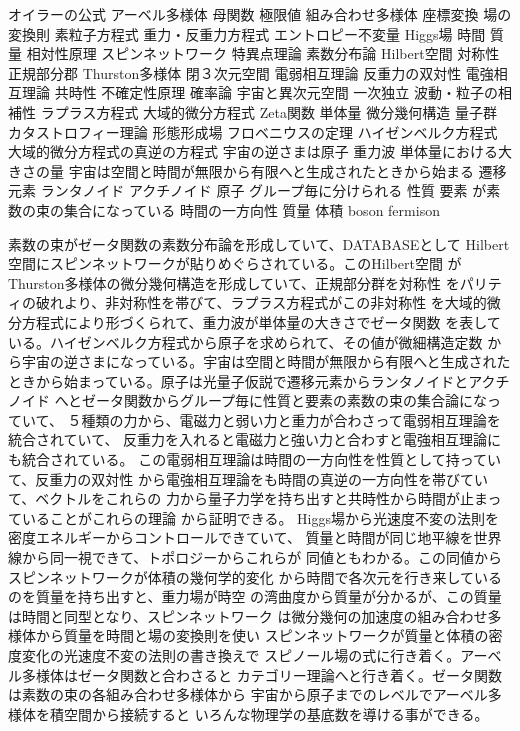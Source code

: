 \documentclass{jsarticle}
\begin{document}
\title{}
\author{}
\date{}
\maketitle

  オイラーの公式 アーベル多様体 母関数 極限値 組み合わせ多様体 
  座標変換 場の変換則 素粒子方程式 重力・反重力方程式
  エントロピー不変量 Higgs場 時間 質量 相対性原理 スピンネットワーク
  特異点理論 素数分布論 Hilbert空間 対称性 正規部分郡
  Thurston多様体 閉３次元空間 電弱相互理論 反重力の双対性
  電強相互理論 共時性 不確定性原理 確率論 宇宙と異次元空間
  一次独立 波動・粒子の相補性 ラプラス方程式 大域的微分方程式
  Zeta関数 単体量 微分幾何構造 量子群 カタストロフィー理論
  形態形成場 フロベニウスの定理 
  ハイゼンベルク方程式 大域的微分方程式の真逆の方程式
  宇宙の逆さまは原子 重力波 単体量における大きさの量 
  宇宙は空間と時間が無限から有限へと生成されたときから始まる
  遷移元素 ランタノイド アクチノイド
  原子 グループ毎に分けられる 
  性質 要素 が素数の束の集合になっている 
  時間の一方向性 
  質量 体積
  boson fermison

  素数の束がゼータ関数の素数分布論を形成していて、DATABASEとして
  Hilbert空間にスピンネットワークが貼りめぐらされている。このHilbert空間
  がThurston多様体の微分幾何構造を形成していて、正規部分群を対称性
  をパリティの破れより、非対称性を帯びて、ラプラス方程式がこの非対称性
  を大域的微分方程式により形づくられて、重力波が単体量の大きさでゼータ関数
  を表している。ハイゼンベルク方程式から原子を求められて、その値が微細構造定数
  から宇宙の逆さまになっている。宇宙は空間と時間が無限から有限へと生成された
  ときから始まっている。原子は光量子仮説で遷移元素からランタノイドとアクチノイド
  へとゼータ関数からグループ毎に性質と要素の素数の束の集合論になっていて、
  ５種類の力から、電磁力と弱い力と重力が合わさって電弱相互理論を統合されていて、
  反重力を入れると電磁力と強い力と合わすと電強相互理論にも統合されている。
  この電弱相互理論は時間の一方向性を性質として持っていて、反重力の双対性
  から電強相互理論をも時間の真逆の一方向性を帯びていて、ベクトルをこれらの
  力から量子力学を持ち出すと共時性から時間が止まっていることがこれらの理論
  から証明できる。
  Higgs場から光速度不変の法則を密度エネルギーからコントロールできていて、
  質量と時間が同じ地平線を世界線から同一視できて、トポロジーからこれらが
  同値ともわかる。この同値からスピンネットワークが体積の幾何学的変化
  から時間で各次元を行き来しているのを質量を持ち出すと、重力場が時空
  の湾曲度から質量が分かるが、この質量は時間と同型となり、スピンネットワーク
  は微分幾何の加速度の組み合わせ多様体から質量を時間と場の変換則を使い
  スピンネットワークが質量と体積の密度変化の光速度不変の法則の書き換えで
  スピノール場の式に行き着く。アーベル多様体はゼータ関数と合わさると
  カテゴリー理論へと行き着く。ゼータ関数は素数の束の各組み合わせ多様体から
  宇宙から原子までのレベルでアーベル多様体を積空間から接続すると
  いろんな物理学の基底数を導ける事ができる。
  
 
  
  
\end{document}

